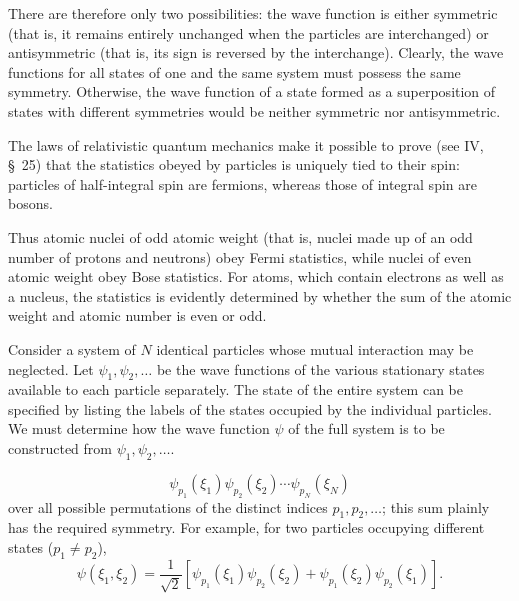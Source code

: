 There are therefore only two possibilities: the wave function is either symmetric (that is, it remains entirely unchanged when the particles are interchanged) or antisymmetric (that is, its sign is reversed by the interchange). Clearly, the wave functions for all states of one and the same system must possess the same symmetry. Otherwise, the wave function of a state formed as a superposition of states with different symmetries would be neither symmetric nor antisymmetric.



The laws of relativistic quantum mechanics make it possible to prove (see IV, §~25) that the statistics obeyed by particles is uniquely tied to their spin: particles of half-integral spin are fermions, whereas those of integral spin are bosons.



Thus atomic nuclei of odd atomic weight (that is, nuclei made up of an odd number of protons and neutrons) obey Fermi statistics, while nuclei of even atomic weight obey Bose statistics. For atoms, which contain electrons as well as a nucleus, the statistics is evidently determined by whether the sum of the atomic weight and atomic number is even or odd.

Consider a system of $N$ identical particles whose mutual interaction may be neglected. Let $\psi_1,\psi_2,\ldots$ be the wave functions of the various stationary states available to each particle separately. The state of the entire system can be specified by listing the labels of the states occupied by the individual particles. We must determine how the wave function $\psi$ of the full system is to be constructed from $\psi_1,\psi_2,\ldots$.


\begin{equation}
  \psi_{p_1}(\xi_1)\psi_{p_2}(\xi_2)\cdots\psi_{p_N}(\xi_N)
  \tag{61.1}
\end{equation}
over all possible permutations of the distinct indices $p_1,p_2,\ldots$; this sum plainly has the required symmetry. For example, for two particles occupying different states ($p_1\ne p_2$),
\begin{equation}
 \psi(\xi_1,\xi_2)=\frac1{\sqrt2}\left[\psi_{p_1}(\xi_1)\psi_{p_2}(\xi_2)+\psi_{p_1}(\xi_2)\psi_{p_2}(\xi_1)\right].
 \tag{61.2}
\end{equation}

